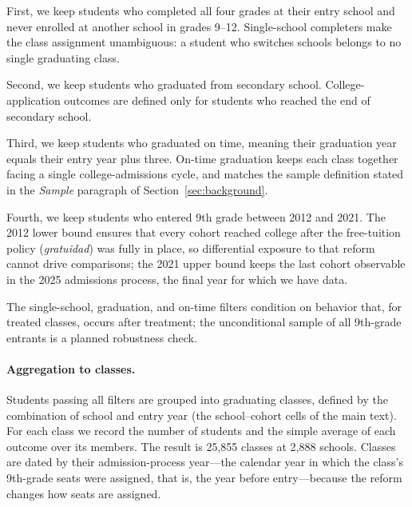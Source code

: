 First, we keep students who completed all four grades at their entry school and never enrolled at another school in grades 9--12. Single-school completers make the class assignment unambiguous: a student who switches schools belongs to no single graduating class.

Second, we keep students who graduated from secondary school. College-application outcomes are defined only for students who reached the end of secondary school.

Third, we keep students who graduated on time, meaning their graduation year equals their entry year plus three. On-time graduation keeps each class together facing a single college-admissions cycle, and matches the sample definition stated in the \textit{Sample} paragraph of Section~\ref{sec:background}.

Fourth, we keep students who entered 9th grade between 2012 and 2021. The 2012 lower bound ensures that every cohort reached college after the free-tuition policy (\textit{gratuidad}) was fully in place, so differential exposure to that reform cannot drive comparisons; the 2021 upper bound keeps the last cohort observable in the 2025 admissions process, the final year for which we have data.

The single-school, graduation, and on-time filters condition on behavior that, for treated classes, occurs after treatment; the unconditional sample of all 9th-grade entrants is a planned robustness check.

\paragraph{Aggregation to classes.}
Students passing all filters are grouped into graduating classes, defined by the combination of school and entry year (the school--cohort cells of the main text). For each class we record the number of students and the simple average of each outcome over its members. The result is 25,855 classes at 2,888 schools. Classes are dated by their admission-process year---the calendar year in which the class's 9th-grade seats were assigned, that is, the year before entry---because the reform changes how seats are assigned.

